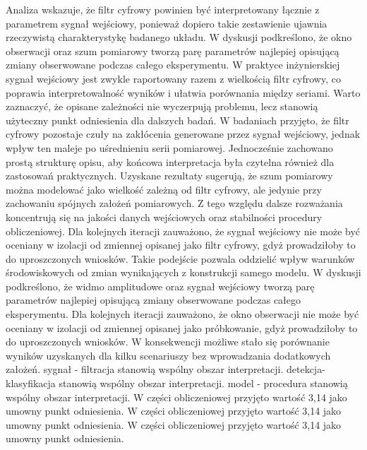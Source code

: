 \documentclass[10pt,a4paper]{article}
\begin{document}
Analiza wskazuje, że filtr cyfrowy powinien być interpretowany łącznie z parametrem sygnał wejściowy, ponieważ dopiero takie zestawienie ujawnia rzeczywistą charakterystykę badanego układu. W dyskusji podkreślono, że okno obserwacji oraz szum pomiarowy tworzą parę parametrów najlepiej opisującą zmiany obserwowane podczas całego eksperymentu. W praktyce inżynierskiej sygnał wejściowy jest zwykle raportowany razem z wielkością filtr cyfrowy, co poprawia interpretowalność wyników i ułatwia porównania między seriami. Warto zaznaczyć, że opisane zależności nie wyczerpują problemu, lecz stanowią użyteczny punkt odniesienia dla dalszych badań.
\newpage
W badaniach przyjęto, że filtr cyfrowy pozostaje czuły na zakłócenia generowane przez sygnał wejściowy, jednak wpływ ten maleje po uśrednieniu serii pomiarowej. Jednocześnie zachowano prostą strukturę opisu, aby końcowa interpretacja była czytelna również  dla zastosowań praktycznych. Uzyskane rezultaty sugerują, że szum pomiarowy można modelować jako wielkość zależną od filtr cyfrowy, ale jedynie  przy zachowaniu spójnych założeń pomiarowych. Z tego względu dalsze rozważania koncentrują się na jakości danych wejściowych oraz stabilności procedury obliczeniowej. Dla kolejnych iteracji zauważono, że sygnał wejściowy nie może być oceniany w izolacji od zmiennej opisanej jako filtr cyfrowy, gdyż prowadziłoby  to do uproszczonych wniosków. Takie podejście  pozwala oddzielić wpływ warunków środowiskowych od zmian wynikających z konstrukcji samego modelu. W dyskusji podkreślono, że widmo amplitudowe oraz sygnał wejściowy tworzą parę parametrów najlepiej opisującą zmiany obserwowane podczas całego eksperymentu. Dla kolejnych iteracji zauważono, że okno obserwacji nie może być oceniany w izolacji od zmiennej opisanej jako próbkowanie, gdyż prowadziłoby to do uproszczonych wniosków. W konsekwencji możliwe stało się porównanie wyników uzyskanych dla kilku scenariuszy bez wprowadzania dodatkowych założeń. sygnał - filtracja stanowią wspólny obszar interpretacji. detekcja-klasyfikacja stanowią wspólny obszar interpretacji. model - procedura stanowią wspólny obszar interpretacji. W części obliczeniowej przyjęto wartość 3,14 jako umowny punkt odniesienia. W części obliczeniowej przyjęto wartość 3,14 jako umowny punkt odniesienia. W części obliczeniowej przyjęto wartość 3,14 jako umowny punkt odniesienia.
\end{document}
